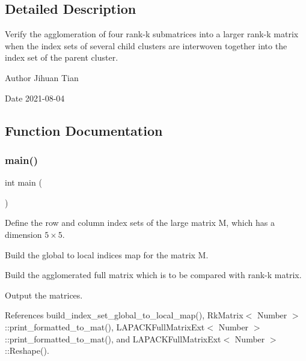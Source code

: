 \subsection{Detailed Description}
Verify the agglomeration of four rank-\/k submatrices into a larger rank-\/k matrix when the index sets of several child clusters are interwoven together into the index set of the parent cluster. 

\begin{DoxyAuthor}{Author}
Jihuan Tian 
\end{DoxyAuthor}
\begin{DoxyDate}{Date}
2021-\/08-\/04 
\end{DoxyDate}


\subsection{Function Documentation}
\mbox{\label{rkmatrix-agglomeration-interwoven-indices_8cc_ae66f6b31b5ad750f1fe042a706a4e3d4}} 
\subsubsection{\texorpdfstring{main()}{main()}}
{\footnotesize\ttfamily int main (\begin{DoxyParamCaption}{ }\end{DoxyParamCaption})}

Define the row and column index sets of the large matrix {\ttfamily M}, which has a dimension $5 \times 5$.

Build the global to local indices map for the matrix {\ttfamily M}.

Build the agglomerated full matrix which is to be compared with rank-\/k matrix.

Output the matrices.

References build\+\_\+index\+\_\+set\+\_\+global\+\_\+to\+\_\+local\+\_\+map(), Rk\+Matrix$<$ Number $>$\+::print\+\_\+formatted\+\_\+to\+\_\+mat(), L\+A\+P\+A\+C\+K\+Full\+Matrix\+Ext$<$ Number $>$\+::print\+\_\+formatted\+\_\+to\+\_\+mat(), and L\+A\+P\+A\+C\+K\+Full\+Matrix\+Ext$<$ Number $>$\+::\+Reshape().

